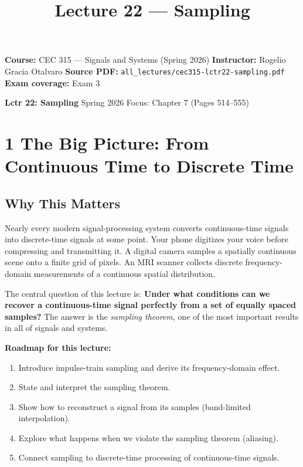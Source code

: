\documentclass[11pt]{article}
\title{Lecture 22 — Sampling}
\author{}
\date{}
\begin{document}
\maketitle

\textbf{Course:} CEC 315 — Signals and Systems (Spring 2026)
\textbf{Instructor:} Rogelio Gracia Otalvaro
\textbf{Source PDF:} \texttt{all\_lectures/cec315-lctr22-sampling.pdf}
\textbf{Exam coverage:} Exam 3

\textbf{Lctr 22: Sampling}
Spring 2026
Focus: Chapter 7 (Pages 514–555)

\section*{1 The Big Picture: From Continuous Time to Discrete Time}

\subsection*{Why This Matters}

Nearly every modern signal-processing system converts continuous-time signals into discrete-time signals at some point. Your phone digitizes your voice before compressing and transmitting it. A digital camera samples a spatially continuous scene onto a finite grid of pixels. An MRI scanner collects discrete frequency-domain measurements of a continuous spatial distribution.

The central question of this lecture is: \textbf{Under what conditions can we recover a continuous-time signal perfectly from a set of equally spaced samples?} The answer is the \textit{sampling theorem}, one of the most important results in all of signals and systems.

\textbf{Roadmap for this lecture:}

\begin{enumerate}
  \item Introduce impulse-train sampling and derive its frequency-domain effect.
  \item State and interpret the sampling theorem.
  \item Show how to reconstruct a signal from its samples (band-limited interpolation).
  \item Explore what happens when we violate the sampling theorem (aliasing).
  \item Connect sampling to discrete-time processing of continuous-time signals.
\end{enumerate}
\end{document}
